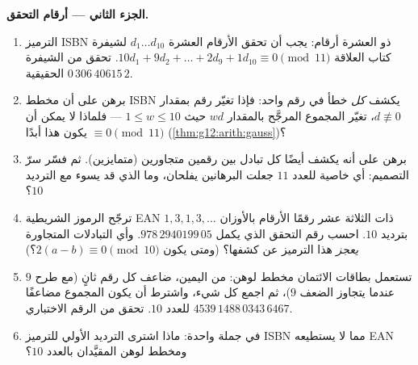 \begin{problem}
\medskip
\noindent\textbf{الجزء الثاني --- أرقام التحقق.}
\begin{enumerate}[resume]
  \item الترميز ISBN ذو العشرة أرقام: يجب أن تحقق الأرقام العشرة $d_1 \dots d_{10}$ لشيفرة
        كتاب العلاقة
        $10d_1 + 9d_2 + \dots + 2d_9 + 1d_{10} \equiv 0
        \pmod{11}$. تحقق من الشيفرة الحقيقية
        $0\,306\,40615\,2$.
  \item برهن على أن مخطط ISBN يكشف \emph{كل}
        خطأ في رقم واحد: فإذا تغيّر رقم بمقدار
        $d \not\equiv 0$، تغيّر المجموع المرجَّح بالمقدار $w d$
        حيث $1 \leq w \leq 10$ --- فلماذا لا يمكن أن يكون هذا أبدًا
        $\equiv 0 \pmod{11}$
        (\cref{thm:g12:arith:gauss})؟
  \item برهن على أنه يكشف أيضًا كل تبادل بين رقمين
        متجاورين (متمايزين). ثم فسّر سرّ التصميم: أي
        خاصية للعدد $11$ جعلت البرهانين يفلحان،
        وما الذي قد يسوء مع الترديد $10$؟
  \item ترجّح الرموز الشريطية EAN ذات الثلاثة عشر رقمًا الأرقام بالأوزان $1, 3, 1, 3, \dots$
        بترديد $10$. احسب رقم التحقق الذي يكمل
        $978\,2940199\,05$. وأي التبادلات المتجاورة \emph{يعجز}
        هذا الترميز عن كشفها؟ (ومتى يكون
        $2(a - b) \equiv 0 \pmod{10}$؟)
  \item تستعمل بطاقات الائتمان مخطط لوهن: من اليمين، ضاعف
        كل رقم ثانٍ (مع طرح $9$ عندما يتجاوز الضعف $9$)،
        ثم اجمع كل شيء، واشترط أن يكون المجموع مضاعفًا للعدد
        $10$. تحقق من الرقم الاختباري
        $4539\,1488\,0343\,6467$.
  \item في جملة واحدة: ماذا اشترى الترديد الأولي للترميز ISBN
        مما لا يستطيعه EAN ومخطط لوهن المقيَّدان بالعدد $10$؟
\end{enumerate}


\end{problem}
